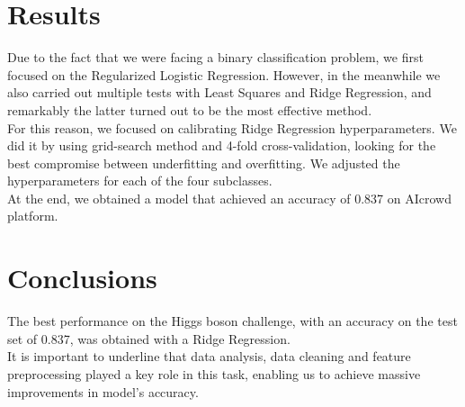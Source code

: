 \documentclass[10pt,conference,compsocconf]{IEEEtran}
\begin{document}
\section{Results}
Due to the fact that we were facing a binary classification problem, we first focused on the Regularized Logistic Regression. However, in the meanwhile we also carried out multiple tests with Least Squares and Ridge Regression, and remarkably the latter turned out to be the most effective method.\\
For this reason, we focused on calibrating Ridge Regression hyperparameters. We did it by using grid-search method and 4-fold cross-validation, looking for the best compromise between underfitting and overfitting. We adjusted the hyperparameters for each of the four subclasses.\\
At the end, we obtained a model that achieved an accuracy of 0.837 on AIcrowd platform.


\section{Conclusions}
The best performance on the Higgs boson
challenge, with an accuracy on the test set of 0.837, was obtained with a Ridge Regression.\\
It is important to underline that data analysis, data cleaning and feature preprocessing played a key role in this task, enabling us to achieve massive improvements in model's accuracy.\\





\end{document}
